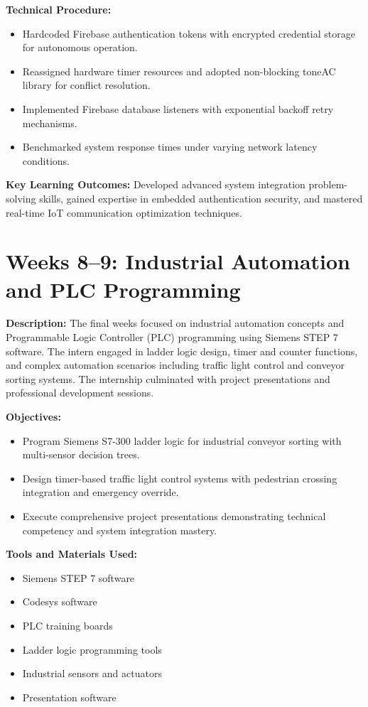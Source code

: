 \documentclass[12pt,a4paper]{report}
\begin{document}
\noindent\textbf{Technical Procedure:}
\begin{itemize}
    \item Hardcoded Firebase authentication tokens with encrypted credential storage for autonomous operation.
    \item Reassigned hardware timer resources and adopted non-blocking toneAC library for conflict resolution.
    \item Implemented Firebase database listeners with exponential backoff retry mechanisms.
    \item Benchmarked system response times under varying network latency conditions.
\end{itemize}

\noindent\textbf{Key Learning Outcomes:} Developed advanced system integration problem-solving skills, gained expertise in embedded authentication security, and mastered real-time IoT communication optimization techniques.

\section{Weeks 8--9: Industrial Automation and PLC Programming}

\noindent\textbf{Description:} The final weeks focused on industrial automation concepts and Programmable Logic Controller (PLC) programming using Siemens STEP 7 software. The intern engaged in ladder logic design, timer and counter functions, and complex automation scenarios including traffic light control and conveyor sorting systems. The internship culminated with project presentations and professional development sessions.

\noindent\textbf{Objectives:}
\begin{itemize}
    \item Program Siemens S7-300 ladder logic for industrial conveyor sorting with multi-sensor decision trees.
    \item Design timer-based traffic light control systems with pedestrian crossing integration and emergency override.
    \item Execute comprehensive project presentations demonstrating technical competency and system integration mastery.
\end{itemize}

\noindent\textbf{Tools and Materials Used:}
\begin{multicols}{2}
\begin{itemize}
    \item Siemens STEP 7 software
    \item Codesys software
    \item PLC training boards
    \item Ladder logic programming tools
    \item Industrial sensors and actuators
    \item Presentation software
\end{itemize}
\end{multicols}
\end{document}
